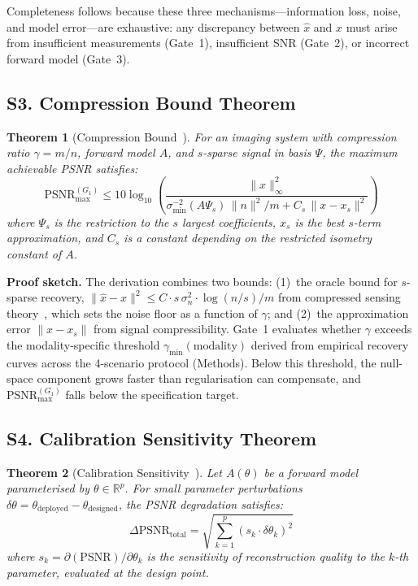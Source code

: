 \documentclass[11pt,a4paper]{article}
\newtheorem{theorem}{Theorem}
\newcommand{\R}{\mathbb{R}}
\begin{document}
Completeness follows because these three mechanisms---information loss, noise, and model error---are exhaustive: any discrepancy between $\hat{x}$ and $x$ must arise from insufficient measurements (Gate~1), insufficient SNR (Gate~2), or incorrect forward model (Gate~3).

\subsection*{S3. Compression Bound Theorem}

\begin{theorem}[Compression Bound~\cite{paperII}]
\label{thm:compression}
For an imaging system with compression ratio $\gamma = m/n$, forward model $A$, and $s$-sparse signal in basis $\Psi$, the maximum achievable PSNR satisfies:
\[
\text{PSNR}_{\max}^{(G_1)} \leq 10\log_{10}\!\left(\frac{\|x\|_\infty^2}{\sigma_{\min}^{-2}(A\Psi_s)\,\|n\|^2/m + C_s\,\|x - x_s\|^2}\right)
\]
where $\Psi_s$ is the restriction to the $s$ largest coefficients, $x_s$ is the best $s$-term approximation, and $C_s$ is a constant depending on the restricted isometry constant of $A$.
\end{theorem}

\textbf{Proof sketch.}
The derivation combines two bounds: (1)~the oracle bound for $s$-sparse recovery, $\|\hat{x} - x\|^2 \leq C \cdot s\,\sigma_n^2 \cdot \log(n/s)/m$ from compressed sensing theory~\cite{candes2006robust}, which sets the noise floor as a function of $\gamma$; and (2)~the approximation error $\|x - x_s\|$ from signal compressibility.  Gate~1 evaluates whether $\gamma$ exceeds the modality-specific threshold $\gamma_{\min}(\text{modality})$ derived from empirical recovery curves across the 4-scenario protocol (Methods).  Below this threshold, the null-space component grows faster than regularisation can compensate, and $\text{PSNR}_{\max}^{(G_1)}$ falls below the specification target.

\subsection*{S4. Calibration Sensitivity Theorem}

\begin{theorem}[Calibration Sensitivity~\cite{paperII}]
\label{thm:calibration}
Let $A(\theta)$ be a forward model parameterised by $\theta \in \R^p$.  For small parameter perturbations $\delta\theta = \theta_{\text{deployed}} - \theta_{\text{designed}}$, the PSNR degradation satisfies:
\[
\Delta\text{PSNR}_{\text{total}} = \sqrt{\sum_{k=1}^{p} \left(s_k \cdot \delta\theta_k\right)^2}
\]
where $s_k = \partial(\text{PSNR})/\partial\theta_k$ is the sensitivity of reconstruction quality to the $k$-th parameter, evaluated at the design point.
\end{theorem}
\end{document}
